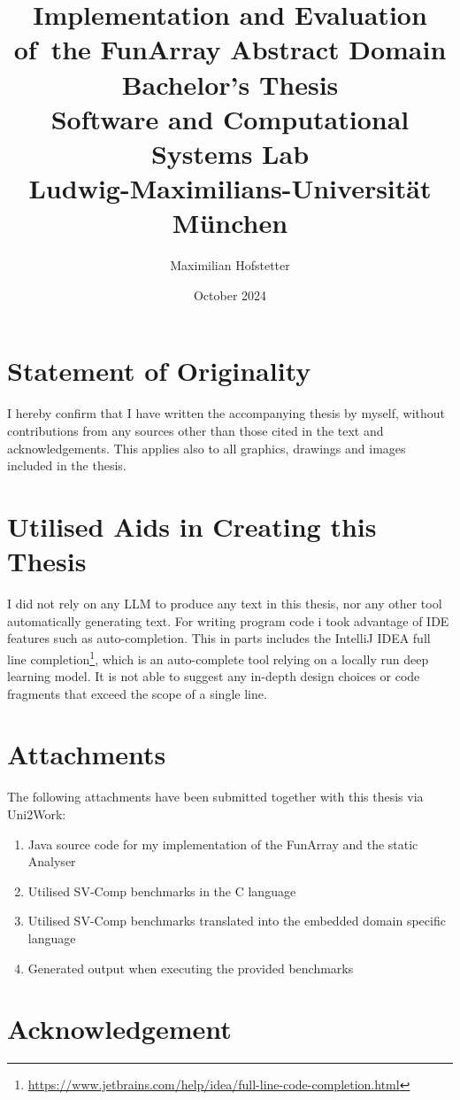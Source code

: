 \documentclass{report}
\title{\Huge{}Implementation and Evaluation of~the FunArray Abstract Domain\\[1em]\large{}Bachelor's Thesis\\[1em]Software and Computational Systems Lab\\Ludwig-Maximilians-Universit\"at M\"unchen}
\date{October 2024}
\author{Maximilian Hofstetter}
\begin{document}
\maketitle

\section*{Statement of Originality}
\thispagestyle{empty}
I hereby confirm that I have written the accompanying thesis by myself, without contributions from any sources other than those cited in the text and acknowledgements. This applies also to all graphics, drawings and images included in the thesis.

\section*{Utilised Aids in Creating this Thesis}

I did not rely on any LLM to produce any text in this thesis, nor any other tool automatically generating text. For writing program code i took advantage of IDE features such as auto-completion. This in parts includes the IntelliJ IDEA full line completion\footnote{\url{https://www.jetbrains.com/help/idea/full-line-code-completion.html}}, which is an auto-complete tool relying on a locally run deep learning model. It is not able to suggest any in-depth design choices or code fragments that exceed the scope of a single line.

\section*{Attachments}

The following attachments have been submitted together with this thesis via Uni2Work:

\begin{enumerate}
	\item Java source code for my implementation of the FunArray and the static Analyser
	\item Utilised SV-Comp benchmarks in the C language
	\item Utilised SV-Comp benchmarks translated into the embedded domain specific language
	\item Generated output when executing the provided benchmarks
\end{enumerate}

\section*{Acknowledgement}
\end{document}
